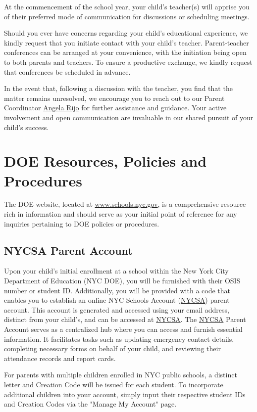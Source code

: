 \documentclass[11pt, letterpaper]{article}
\begin{document}
At the commencement of the school year, your child's teacher(s) will apprise you of their preferred mode of communication for discussions or scheduling meetings.

Should you ever have concerns regarding your child's educational experience, we kindly request that you initiate contact with your child's teacher. Parent-teacher conferences can be arranged at your convenience, with the initiation being open to both parents and teachers. To ensure a productive exchange, we kindly request that conferences be scheduled in advance.

In the event that, following a discussion with the teacher, you find that the matter remains unresolved, we encourage you to reach out to our Parent Coordinator \href{arijo@schools.nyc.gov}{Angela Rijo} for further assistance and guidance. Your active involvement and open communication are invaluable in our shared pursuit of your child's success.

\section{DOE Resources, Policies and Procedures} 
The DOE website, located at \href{https://www.schools.nyc.gov}{www.schools.nyc.gov}, is a comprehensive resource rich in information and should serve as your initial point of reference for any inquiries pertaining to DOE policies or procedures.

\subsection{NYCSA Parent Account} 
Upon your child's initial enrollment at a school within the New York City Department of Education (NYC DOE), you will be furnished with their OSIS number or student ID. Additionally, you will be provided with a code that enables you to establish an online NYC Schools Account (\href{https://www.schoolsaccount.nyc/}{NYCSA}) parent account. This account is generated and accessed using your email address, distinct from your child's, and can be accessed at \href{https://www.schoolsaccount.nyc/}{NYCSA}. The \href{https://www.schoolsaccount.nyc/}{NYCSA} Parent Account serves as a centralized hub where you can access and furnish essential information. It facilitates tasks such as updating emergency contact details, completing necessary forms on behalf of your child, and reviewing their attendance records and report cards.

For parents with multiple children enrolled in NYC public schools, a distinct letter and Creation Code will be issued for each student. To incorporate additional children into your account, simply input their respective student IDs and Creation Codes via the "Manage My Account" page.
\end{document}
